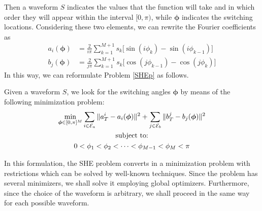 Then a waveform $S$ indicates the values that the function will take and in which order they will appear within the interval $[0,\pi) $, while $\bm{\phi}$ indicates the switching locations. Considering these two elements, we can rewrite the Fourier coefficients as
\begin{equation}
    \begin{aligned}
        a_i(\bm{\phi}) & =  \frac{2}{i\pi} \sum_{k=1}^{M+1} s_k \Big[\sin(i\phi_k) -\sin(i\phi_{k-1})\Big]
        \\
        b_j(\bm{\phi}) & = \frac{2}{j\pi} \sum_{k=1}^{M+1} s_k \Big[\cos(j\phi_{k-1}) -\cos(j\phi_{k})\Big]
    \end{aligned}
\end{equation}
In this way, we can reformulate Problem \ref{SHEp} as follows.
\newline
\begin{problem}
Given a waveform $S$, we look for the switching angles $\bm{\phi}$ by means of the following minimization problem:
    \begin{gather}
        \min_{\bm{\phi} \in [0,\pi]^{M}} \sum_{i\in\mathcal{E}_a} \|a_T^i - a_i(\bm{\phi})\|^2 + \sum_{j\in \mathcal{E}_b} \|b_T^j - b_j(\bm{\phi})\|^2 
        \\
        \notag \text{subject to:}
        \\
        \notag 0 <\phi_1 < \phi_2 < \dots < \phi_{M-1} < \phi_{M} < \pi 
    \end{gather}
\end{problem}
In this formulation, the SHE problem converts in a minimization problem with restrictions which can be solved by well-known techniques. Since the problem has several minimizers, we shall solve it employing global optimizers. Furthermore, since the choice of the waveform is arbitrary, we shall proceed in the same way for each possible waveform. 

{\color{red}{
    Tengo que enlazar estas sección con la formulacion de control óptimo.
}}